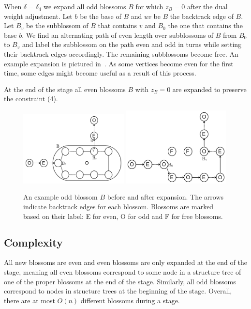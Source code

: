 When $\delta = \delta_4$ we expand all odd blossoms $B$ for which $z_B = 0$ after the dual weight adjustment. Let $b$ be the base of $B$ and $uv$ be $B$ the backtrack edge of $B$. Let $B_v$ be the subblossom of $B$ that contains $v$ and $B_0$ the one that contains the base $b$. We find an alternating path of even length over subblossoms of $B$ from $B_0$ to $B_v$ and label the subblossom on the path even and odd in turns while setting their backtrack edges accordingly. The remaining subblossoms become free. An example expansion is pictured in~. As some vertices become even for the first time, some edges might become useful as a result of this process.

At the end of the stage all even blossoms $B$ with $z_B = 0$ are expanded to preserve the constraint (4).

\begin{figure}
    \centering
    \includegraphics*[width=0.49\textwidth]{figures/Odd expansion.png}
    \includegraphics*[width=0.49\textwidth]{figures/Odd expanded.png}
    \caption{An example odd blossom $B$ before and after expansion. The arrows indicate backtrack edges for each blossom. Blossoms are marked based on their label: E for even, O for odd and F for free blossoms.}
\end{figure}

\subsection{Complexity}

All new blossoms are even and even blossoms are only expanded at the end of the stage, meaning all even blossoms correspond to some node in a structure tree of one of the proper blossoms at the end of the stage. Similarly, all odd blossoms correspond to nodes in structure trees at the beginning of the stage. Overall, there are at most $O(n)$ different blossoms during a stage. 

